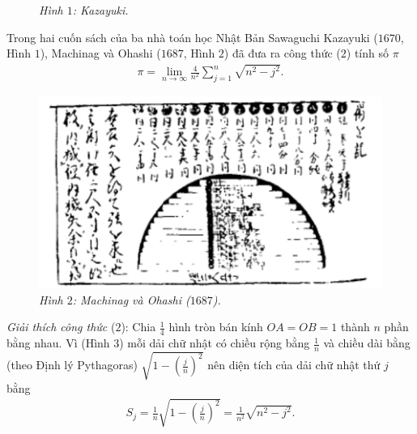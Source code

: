 \begin{multicols}{2}
\begin{figure}[H]
		\caption{\small\textit{\color{lichsutoanhoc}Hình $1$: Kazayuki.}}
		\vspace*{-10pt}
	\end{figure}
	Trong hai cuốn sách của ba nhà toán học Nhật Bản Sawaguchi Kazayuki ($1670$, Hình $1$), Machinag và Ohashi ($1687$, Hình $2$) đã đưa ra công thức ($2$) tính số $\pi$ 
	\begin{align*}
		\pi  = \mathop {\lim }\limits_{n \to \infty } \frac{4}{{{n^2}}}\sum\limits_{j = 1}^n {\sqrt {{n^2} - {j^2}} }. \tag{$2$}
	\end{align*}
	 \begin{figure}[H]
	 	\vspace*{-5pt}
	 	\centering
	 	\captionsetup{labelformat= empty, justification=centering}
	 	\includegraphics[width= 1\linewidth]{2}
	 	\caption{\small\textit{\color{lichsutoanhoc}Hình $2$: Machinag và Ohashi ($1687$).}}
	 	\vspace*{-10pt}
	 \end{figure}
	\textit{Giải thích công thức} ($2$): Chia $\frac{1}{4}$ hình tròn bán kính $OA= OB = 1$  thành $n$  phần bằng nhau. Vì (Hình $3$) mỗi dải chữ nhật có chiều rộng bằng $\frac{1}{n}$  và chiều dài bằng (theo Định lý Pythagoras) $\sqrt{1- \left(\frac{j}{n}\right)^2}$ nên diện tích của dải chữ nhật thứ  $j$ bằng	 
	\begin{align*}
		{S_j} = \frac{1}{n}\sqrt {1 - {{\left( {\frac{j}{n}} \right)}^2}}  = \frac{1}{{{n^2}}}\sqrt {{n^2} - {j^2}}.
	\end{align*}
	\begin{figure}[H]
		\vspace*{-5pt}
		\centering
		\captionsetup{labelformat= empty, justification=centering}

\end{figure}
\end{multicols}
